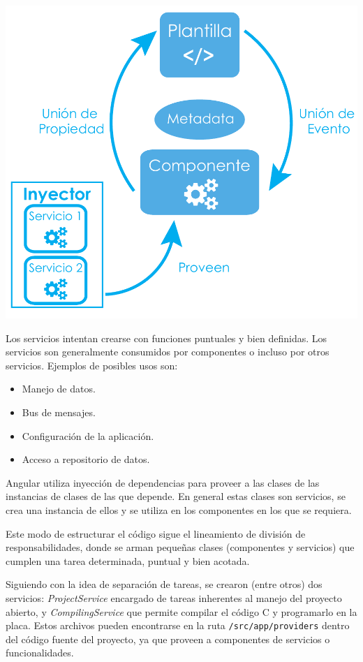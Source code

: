 \begin{center}
    \includegraphics[scale=.7]{./Figures/componente-angular.pdf}
    \label{fig:angularComponent}
\end{center}

Los servicios intentan crearse con funciones puntuales y bien definidas. Los servicios son generalmente consumidos por componentes o incluso por otros servicios. Ejemplos de posibles usos son: 
\begin{itemize}
\item Manejo de datos.
\item Bus de mensajes.
\item Configuración de la aplicación.
\item Acceso a repositorio de datos.
\end{itemize}

Angular utiliza inyección de dependencias para proveer a las clases de las instancias de clases de las que depende. En general estas clases son servicios, se crea una instancia de ellos y se utiliza en los componentes en los que se requiera.

Este modo de estructurar el código sigue el lineamiento de división de responsabilidades, donde se arman pequeñas clases (componentes y servicios) que cumplen una tarea determinada, puntual y bien acotada.

Siguiendo con la idea de separación de tareas, se crearon (entre otros) dos servicios: \emph{ProjectService} encargado de tareas inherentes al manejo del proyecto abierto, y \emph{CompilingService} que permite compilar el código C y programarlo en la placa. Estos archivos pueden encontrarse en la ruta \texttt{/src/app/providers} dentro del código fuente del proyecto, ya que proveen a componentes de servicios o funcionalidades.

